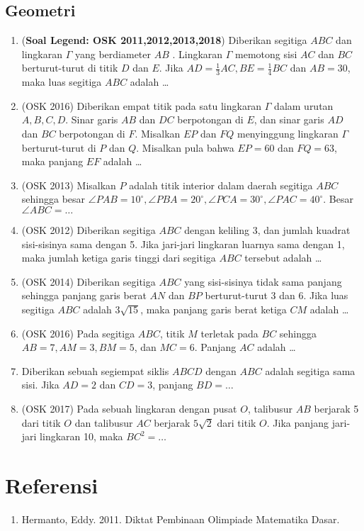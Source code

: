 \documentclass[11pt]{scrartcl}
\begin{document}
    \subsection{Geometri}
        \begin{enumerate}
            \item (\textbf{Soal Legend: OSK 2011,2012,2013,2018}) Diberikan segitiga $ABC$ dan lingkaran $\Gamma$ yang berdiameter $AB$ . Lingkaran $\Gamma$ memotong sisi $AC$ dan $BC$ berturut-turut di titik $D$ dan $E$. Jika $AD = \frac13 AC, BE =\frac14 BC$ dan $AB = 30$, maka luas segitiga $ABC$ adalah \dots
            
            \item (OSK 2016) Diberikan empat titik pada satu lingkaran $\Gamma$ dalam urutan $A,B,C,D$. Sinar garis $AB$ dan $DC$ berpotongan di $E$, dan sinar garis $AD$ dan $BC$ berpotongan di $F$. Misalkan $EP$ dan $FQ$ menyinggung lingkaran $\Gamma$ berturut-turut di $P$ dan $Q$. Misalkan pula bahwa $EP=60$ dan $FQ=63$, maka panjang $EF$ adalah \dots
            
            \item (OSK 2013) Misalkan $P$ adalah titik interior dalam daerah segitiga $ABC$ sehingga besar $\angle PAB = 10^\circ, \angle PBA = 20^\circ, \angle PCA = 30^\circ, \angle PAC=40^\circ$. Besar $\angle ABC = \dots$
            
            \item (OSK 2012) Diberikan segitiga $ABC$ dengan keliling 3, dan jumlah kuadrat sisi-sisinya sama dengan 5. Jika jari-jari lingkaran luarnya sama dengan 1, maka jumlah ketiga garis tinggi dari segitiga $ABC$ tersebut adalah \dots
            
            \item (OSK 2014) Diberikan segitiga $ABC$ yang sisi-sisinya tidak sama panjang sehingga panjang garis berat $AN$ dan $BP$ berturut-turut 3 dan 6. Jika luas segitiga $ABC$ adalah $3\sqrt{15}$, maka panjang garis berat ketiga $CM$ adalah \dots
            
            \item (OSK 2016) Pada segitiga $ABC$, titik $M$ terletak pada $BC$ sehingga $AB=7, AM=3, BM=5$, dan $MC=6$. Panjang $AC$ adalah \dots
            
            \item Diberikan sebuah segiempat siklis $ABCD$ dengan $ABC$ adalah segitiga sama sisi. Jika $AD=2$ dan $CD=3$, panjang $BD=\dots$
            
            \item (OSK 2017) Pada sebuah lingkaran dengan pusat $O$, talibusur $AB$ berjarak 5 dari titik $O$ dan talibusur $AC$ berjarak $5\sqrt{2}$ dari titik $O$. Jika panjang jari-jari lingkaran 10, maka $BC^2=\dots$
        \end{enumerate} 
    
    \section{Referensi}
        \begin{enumerate}
            \item Hermanto, Eddy. 2011. Diktat Pembinaan Olimpiade Matematika Dasar.
        \end{enumerate}
\end{document}
